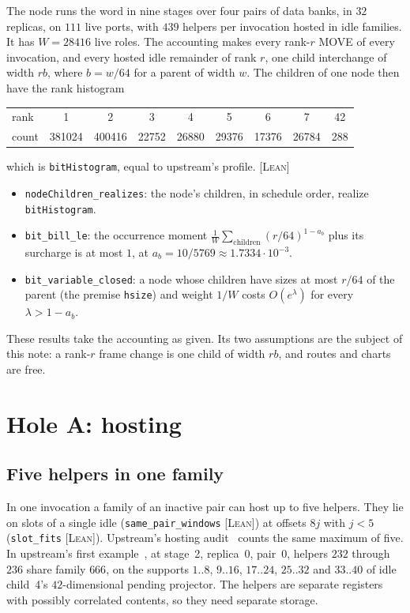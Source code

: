 \documentclass[11pt]{amsart}
\newcommand{\lean}[1]{\texttt{#1}}
\newcommand{\tagL}{\textsc{[Lean]}}
\begin{document}
The node runs the word in nine stages over four pairs of data banks, in $32$ replicas, on $111$
live ports, with $439$ helpers per invocation hosted in idle families. It has $W = 28416$ live roles.
The accounting makes every rank-$r$ MOVE of every invocation, and every hosted idle remainder of
rank $r$, one child interchange of width $r b$, where $b = w/64$ for a parent of width $w$. The
children of one node then have the rank histogram
\begin{center}
\begin{tabular}{lcccccccc}
\toprule
rank & 1 & 2 & 3 & 4 & 5 & 6 & 7 & 42\\
count & 381024 & 400416 & 22752 & 26880 & 29376 & 17376 & 26784 & 288\\
\bottomrule
\end{tabular}
\end{center}
which is \lean{bitHistogram}, equal to upstream's profile. \tagL{}
\begin{itemize}
\item \lean{nodeChildren\_realizes}: the node's children, in schedule order, realize
  \lean{bitHistogram}.
\item \lean{bit\_bill\_le}: the occurrence moment $\frac{1}{W}\sum_{\text{children}} (r/64)^{1-a_b}$
  plus its surcharge is at most $1$, at $a_b = 10/5769 \approx 1.7334 \cdot 10^{-3}$.
\item \lean{bit\_variable\_closed}: a node whose children have sizes at most $r/64$ of the parent
  (the premise \lean{hsize}) and weight $1/W$ costs $O(e^\lambda)$ for every
  $\lambda > 1 - a_b$.
\end{itemize}
These results take the accounting as given. Its two assumptions are the subject of this note:
a rank-$r$ frame change is one child of width $r b$, and routes and charts are free.

\section{Hole A: hosting}

\subsection{Five helpers in one family}
In one invocation a family of an inactive pair can host up to five helpers. They lie on slots of a
single idle (\lean{same\_pair\_windows} \tagL{}) at offsets $8j$ with $j < 5$ (\lean{slot\_fits}
\tagL{}). Upstream's hosting audit~\cite{HA} counts the same maximum of five. In upstream's first
example~\cite{FH}, at stage~2, replica~0, pair~0, helpers $232$ through $236$ share family $666$, on
the supports $1..8$, $9..16$, $17..24$, $25..32$ and $33..40$ of idle child~4's $42$-dimensional
pending projector. The helpers are separate registers with possibly correlated contents, so they
need separate storage.
\end{document}
